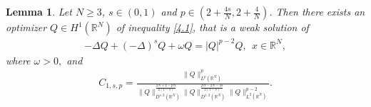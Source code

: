 \documentclass[12pt,a4paper,reqno]{amsart}
\numberwithin{equation}{section}
\newtheorem{lemma}{Lemma}[section]
\begin{document}
\begin{lemma}\label{Lemma4.2}
Let $N\geqslant 3$, $s\in(0,1)$ and $p \in(2+\frac{4s}{N},2+\frac{4}{N})$.
Then there exists an optimizer $Q\in H^{1}(\mathbb{R}^{N})$ of inequality \eqref{4.1},
that is a weak solution of
\begin{equation}\label{4.4}
\begin{aligned}
-\Delta Q
+(-\Delta)^{s}Q+\omega Q=|Q|^{p-2}Q, \ \ x\in \mathbb{R}^{N},
\end{aligned}
\end{equation}
where $\omega>0,$ and
\begin{equation*}
\begin{aligned}
C_{1,s,p}
=
\frac
{\|Q\|_{L^{p}(\mathbb{R}^{N})}^{p}}
{
\|Q\|_{D^{s,2}(\mathbb{R}^{N})}^{\frac{2N+4-pN}{2(1-s)}}
\|Q\|_{D^{1,2}(\mathbb{R}^{N})}^{\frac{pN-2N-4s}{2(1-s)}}
\|Q\|_{L^{2}(\mathbb{R}^{N})}^{p-2}
}.
\end{aligned}
\end{equation*}
\end{lemma}
\end{document}
